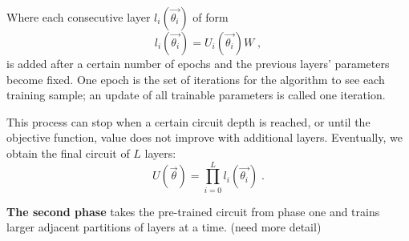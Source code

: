 Where each consecutive layer $l_i(\vec{\theta_i})$ of form
\begin{equation}
    l_i(\vec{\theta_i})
    =U_i(\vec{\theta_i}) W \;,
\end{equation}
is added after a certain number of epochs and the previous layers' parameters become fixed. 
One epoch is the set of iterations for the algorithm to see each training sample; an update of all trainable parameters is called one iteration.

This process can stop when a certain circuit depth is reached, or until the objective function, value does not improve with additional layers.
Eventually, we obtain the final circuit of $L$ layers:
\begin{equation}
    U(\vec{\theta})
    = \prod_{i=0}^L l_i (\vec{\theta_i}) \;.
\end{equation}

\textbf{The second phase} takes the pre-trained circuit from phase one and trains larger adjacent partitions of layers at a time. (need more detail)